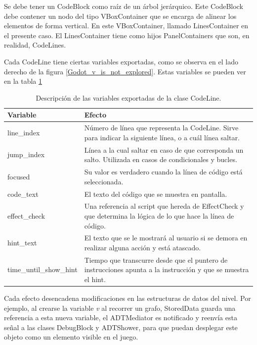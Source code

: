Se debe tener un CodeBlock como raíz de un árbol jerárquico. Este CodeBlock debe contener un nodo del tipo VBoxContainer que se encarga de alinear los elementos de forma vertical. En este VBoxContainer, llamado LinesContainer en el presente caso. El LinesContainer tiene como hijos PanelContainers que son, en realidad, CodeLines.

Cada CodeLine tiene ciertas variables exportadas, como se observa en el lado derecho de la figura \ref{Godot_v_is_not_explored}. Estas variables se pueden ver en la tabla \ref{table_code_line_variables}

\begin{table}[!h]
    \centering
    \begin{tabular}{|l|p{}|}
        \hline
        \textbf{Variable} & \textbf{Efecto} \\
        \hline
        line\_index & Número de línea que representa la CodeLine. Sirve para indicar la siguiente línea, o a cuál línea saltar. \\
        \hline
        jump\_index  & Línea a la cual saltar en caso de que corresponda un salto. Utilizada en casos de condicionales y bucles. \\
        \hline
        focused & Su valor es verdadero cuando la línea de código está seleccionada. \\
        \hline
		code\_text & El texto del código que se muestra en pantalla. \\
        \hline
        effect\_check & Una referencia al script que hereda de EffectCheck y que determina la lógica de lo que hace la línea de código. \\
        \hline
        hint\_text  & El texto que se le mostrará al usuario si se demora en realizar alguna acción y está atascado. \\
        \hline
        time\_until\_show\_hint & Tiempo que transcurre desde que el puntero de instrucciones apunta a la instrucción y que se muestra el hint. \\
        \hline
    \end{tabular}
    \caption{Descripción de las variables exportadas de la clase CodeLine.}
    \label{table_code_line_variables}
\end{table}


Cada efecto desencadena modificaciones en las estructuras de datos del nivel. Por ejemplo, al crearse la variable \emph{v} al recorrer un grafo, StoredData guarda una referencia a esta nueva variable, el ADTMediator es notificado y reenvía esta señal a las clases DebugBlock y ADTShower, para que puedan desplegar este objeto como un elemento visible en el juego.



